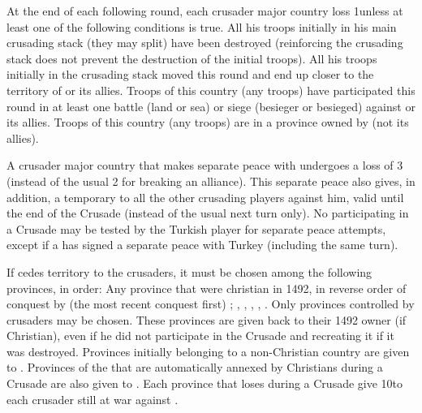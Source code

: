 \aparag At the end of each following round, each crusader major country loss
1\STAB unless at least one of the following conditions is true.
\bparag All his troops initially in his main crusading stack (they may split)
have been destroyed (reinforcing the crusading stack does not prevent the
destruction of the initial troops).
\bparag All his troops initially in the crusading stack moved this round and
end up closer to the territory of \TUR or its allies.
\bparag Troops of this country (any troops) have participated this round in at
least one battle (land or sea) or siege (besieger or besieged) against \TUR or
its allies.
\bparag Troops of this country (any troops) are in a province owned by \TUR
(not its allies).

\phpaix
{}
A crusader major country that makes separate peace with \TUR undergoes a loss
of 3 \STAB (instead of the usual 2 for breaking an alliance). This separate
peace also gives, in addition, a temporary \CB to all the other crusading
players against him, valid until the end of the Crusade (instead of the usual
next turn only).
\bparag No \MIN participating in a Crusade may be tested by the Turkish player
for separate peace attempts, except if a \MAJ has signed a separate peace with
Turkey (including the same turn).

 If \TUR cedes territory to the crusaders, it must be
chosen among the following provinces, in order:
\bparag Any province that were christian in 1492, in reverse order of conquest
by \TUR (the most recent conquest first) ; \provinceMoreas , \provinceHellas,
, \provinceLubnan, \provinceAlep.
\bparag Only provinces controlled by crusaders may be chosen.
\bparag These provinces are given back to their 1492 owner (if Christian),
even if he did not participate in the Crusade and recreating it if it was
destroyed. Provinces initially belonging to a non-Christian country are given
to \paysChevaliers.
\bparag Provinces of the \regionBalkans that are automatically annexed by
Christians during a Crusade are also given to \paysChevaliers.
\bparag Each province that \TUR loses during a Crusade give 10\VPs to each
crusader still at war against \TUR.

\stopevents


